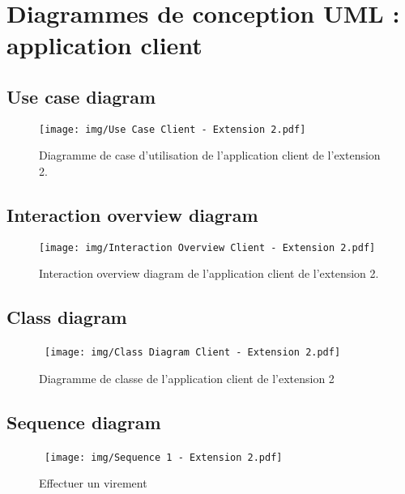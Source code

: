 \documentclass[]{report}
\begin{document}
\newpage



\section{Diagrammes de conception UML : application client}



\subsection{Use case diagram}

\begin{figure}[h]
	\centering\texttt{[image: img/Use Case Client - Extension 2.pdf]}
	\caption{Diagramme de case d'utilisation de l'application client de l'extension 2.}
\end{figure}

\newpage

\subsection{Interaction overview diagram}

\begin{figure}[h]
	\centering\texttt{[image: img/Interaction Overview Client - Extension 2.pdf]}
	\caption{Interaction overview diagram de l'application client de l'extension 2.}
\end{figure}


\newpage

\subsection{Class diagram}

\begin{figure}[h!]
	\hbox{
		\centering\texttt{[image: img/Class Diagram Client - Extension 2.pdf]}
	}
	\caption{Diagramme de classe de l'application client de l'extension 2}
\end{figure}
\newpage

\newpage

\subsection{Sequence diagram}

\begin{figure}[h!]
	\hbox{
		\centering\texttt{[image: img/Sequence 1 - Extension 2.pdf]}
	}
	\caption{Effectuer un virement}
	\end{figure}

\newpage
\end{document}
